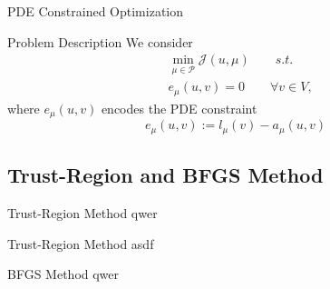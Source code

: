 \begin{frame}{PDE Constrained Optimization}
    \begin{block}{Problem Description}
        We consider
        \begin{align*}
            &\min\limits_{\mu \in \mathcal{P}} \mathcal{J}(u, \mu) \qquad s.t.\\
            &e_\mu(u, v) = 0 \qquad \forall v \in V,
        \end{align*}
        where $e_\mu(u, v)$ encodes the PDE constraint
        \begin{equation*}
            e_\mu(u, v) := l_\mu(v) - a_\mu(u, v)
        \end{equation*}
    \end{block}
\end{frame}

\subsection{Trust-Region and BFGS Method}

\begin{frame}{Trust-Region Method}
    qwer
\end{frame}

\begin{frame}{Trust-Region Method}
    asdf
\end{frame}

\begin{frame}{BFGS Method}
    qwer
\end{frame}